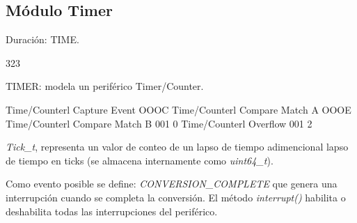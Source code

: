 \subsection{Módulo Timer}
Duración: TIME.

323

TIMER: modela un periférico Timer/Counter.

Time/Counterl Capture Event OOOC
Time/Counterl Compare Match A OOOE
Time/Counterl Compare Match B 001 0
Time/Counterl Overflow 001 2


\emph{Tick\_t}, representa un valor de conteo de un lapso de tiempo adimencional lapso de tiempo en ticks (se almacena internamente como \emph{uint64\_t}).

Como evento posible se define: \emph{CONVERSION\_COMPLETE} que genera una interrupción cuando se completa la conversión. El método \emph{interrupt()} habilita  o deshabilita todas las interrupciones del periférico.
